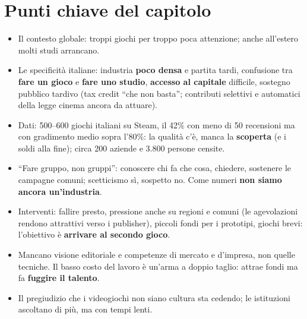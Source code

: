 \section*{Punti chiave del capitolo}

\begin{itemize}
  \item Il contesto globale: troppi giochi per troppo poca attenzione; anche
        all'estero molti studi arrancano.
  \item Le specificità italiane: industria \textbf{poco densa} e partita tardi,
        confusione tra \textbf{fare un gioco} e \textbf{fare uno studio},
        \textbf{accesso al capitale} difficile, sostegno pubblico tardivo
        (tax credit ``che non basta''; contributi selettivi e automatici della
        legge cinema ancora da attuare).
  \item Dati: 500--600 giochi italiani su Steam, il 42\% con meno di 50
        recensioni ma con gradimento medio sopra l'80\%: la qualità c'è, manca la
        \textbf{scoperta} (e i soldi alla fine); circa 200 aziende e 3.800 persone
        censite.
  \item ``Fare gruppo, non gruppi'': conoscere chi fa che cosa, chiedere,
        sostenere le campagne comuni; scetticismo sì, sospetto no. Come numeri
        \textbf{non siamo ancora un'industria}.
  \item Interventi: fallire presto, pressione anche su regioni e comuni (le
        agevolazioni rendono attrattivi verso i publisher), piccoli fondi per i
        prototipi, giochi brevi: l'obiettivo è \textbf{arrivare al secondo
        gioco}.
  \item Mancano visione editoriale e competenze di mercato e d'impresa, non
        quelle tecniche. Il basso costo del lavoro è un'arma a doppio taglio:
        attrae fondi ma fa \textbf{fuggire il talento}.
  \item Il pregiudizio che i videogiochi non siano cultura sta cedendo; le
        istituzioni ascoltano di più, ma con tempi lenti.
\end{itemize}
